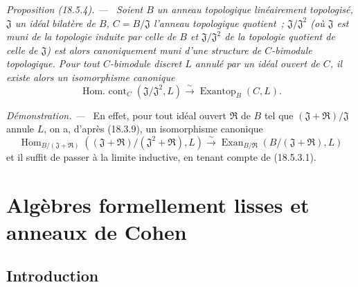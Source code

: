 \documentclass[10pt,oneside]{book}
\makeatletter
\newcommand{\setmanualcurrentlabel}[1]{\def\@currentlabel{#1}}
\newcommand{\oldpage}[2][]{%
  \setcounter{footnote}{0}%
  \marginpar{\scriptsize\textbf{#1}~|~#2}\ignorespaces}
\newenvironment{proposition}[1][]{%
  \setmanualcurrentlabel{#1}\par\medskip\noindent\itshape Proposition (#1). ---\ }{\par}
\newenvironment{proof}{%
  \par\medskip\noindent\textit{Démonstration. ---\ }}{\par}
\makeatother
\begin{document}
\begin{proposition}[18.5.4]
\label{0.18.5.4-fr}
Soient $B$ un anneau topologique linéairement topologisé, $\mathfrak J$ un
idéal bilatère de $B$, $C=B/\mathfrak J$ l'anneau topologique quotient~;
$\mathfrak J/\mathfrak J^2$ (où $\mathfrak J$ est muni de la topologie induite
par celle de $B$ et $\mathfrak J/\mathfrak J^2$ de la topologie quotient de
celle de $\mathfrak J$) est alors canoniquement muni d'une structure de
$C$-bimodule topologique. Pour tout $C$-bimodule discret $L$ annulé par un
idéal ouvert de $C$, il existe alors un isomorphisme canonique
\begin{equation}
\label{0.18.5.4.1-fr}
\tag{18.5.4.1}
  \operatorname{Hom.\ cont}_C(\mathfrak J/\mathfrak J^2,L)
  \xrightarrow{\sim}\operatorname{Exantop}_B(C,L).
\end{equation}
\end{proposition}

\begin{proof}
En effet, pour tout idéal ouvert $\mathfrak R$ de $B$ tel que
$(\mathfrak J+\mathfrak R)/\mathfrak J$ annule $L$, on a, d'après (18.3.9),
un isomorphisme canonique
\[
  \operatorname{Hom}_{B/(\mathfrak J+\mathfrak R)}
    ((\mathfrak J+\mathfrak R)/(\mathfrak J^2+\mathfrak R),L)
  \xrightarrow{\sim}
  \operatorname{Exan}_{B/\mathfrak R}(B/(\mathfrak J+\mathfrak R),L)
\]
et il suffit de passer à la limite inductive, en tenant compte de (18.5.3.1).
\end{proof}


%
\section{Algèbres formellement lisses et anneaux de Cohen}
\label{section:0.19-fr}
\label{0.19-fr}

\setcounter{subsection}{-1}
\subsection{Introduction}
\label{subsection:0.19.0-fr}
\label{0.19.0-fr}

\oldpage[0\textsubscript{IV-1}]{69}
\end{document}
